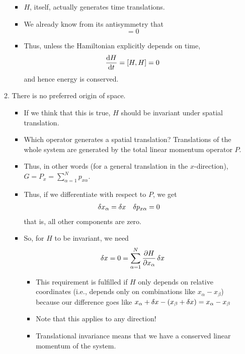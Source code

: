 \documentclass[../notes.tex]{subfiles}
\begin{document}
\begin{itemize}
\begin{enumerate}
\begin{itemize}
            \item $H$, itself, actually generates time translations.
            \item We already know from its antisymmetry that
            \begin{equation*}
                [H,H] = 0
            \end{equation*}
            \item Thus, unless the Hamiltonian explicitly depends on time,
            \begin{equation*}
                \dv{H}{t} = [H,H] = 0
            \end{equation*}
            and hence energy is conserved.
        \end{itemize}
        \item There is no preferred origin of space.
        \begin{itemize}
            \item If we think that this is true, $H$ should be invariant under spatial translation.
            \item Which operator generates a spatial translation? Translations of the whole system are generated by the total linear momentum operator $P$.
            \item Thus, in other words (for a general translation in the $x$-direction), $G=P_x=\sum_{\alpha=1}^Np_{x\alpha}$.
            \item Thus, if we differentiate with respect to $P$, we get
            \begin{align*}
                \var{x_\alpha} &= \var{x}&
                \var{p_{x\alpha}} &= 0
            \end{align*}
            that is, all other components are zero.
            \item So, for $H$ to be invariant, we need
            \begin{equation*}
                [H,P_x]\var{x} = 0 = \sum_{\alpha=1}^N\pdv{H}{x_\alpha}\var{x}
            \end{equation*}
            \begin{itemize}
                \item This requirement is fulfilled if $H$ only depends on relative coordinates (i.e., depends only on combinations like $x_\alpha-x_\beta$) because our difference goes like $x_\alpha+\var{x}-(x_\beta+\var{x}) = x_\alpha-x_\beta$
                \item Note that this applies to any direction!
                \item Translational invariance means that we have a conserved linear momentum of the system.

\end{itemize}
\end{itemize}
\end{enumerate}
\end{itemize}
\end{document}
